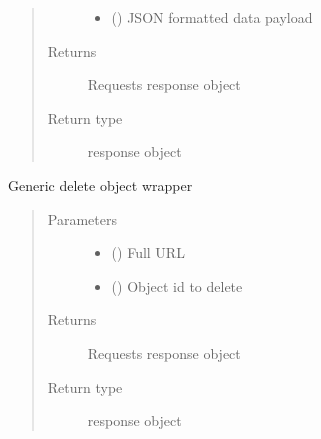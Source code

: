 \documentclass[letterpaper,10pt,english]{sphinxmanual}
\begin{document}
\begin{fulllineitems}
\begin{fulllineitems}
\begin{quote}
\begin{description}
\begin{itemize}
\item {} 
\sphinxAtStartPar
{} () \textendash{} JSON formatted data payload

\end{itemize}

\item[{Returns}] \leavevmode
\sphinxAtStartPar
Requests response object

\item[{Return type}] \leavevmode
\sphinxAtStartPar
response object

\end{description}\end{quote}

\end{fulllineitems}


\begin{fulllineitems}
\label{\detokenize{code:bloxone.bloxone.b1.delete}}
\sphinxAtStartPar
Generic delete object wrapper
\begin{quote}\begin{description}
\item[{Parameters}] \leavevmode\begin{itemize}
\item {} 
\sphinxAtStartPar
{} () \textendash{} Full URL

\item {} 
\sphinxAtStartPar
{} () \textendash{} Object id to delete

\end{itemize}

\item[{Returns}] \leavevmode
\sphinxAtStartPar
Requests response object

\item[{Return type}] \leavevmode
\sphinxAtStartPar
response object

\end{description}\end{quote}


\end{fulllineitems}
\end{fulllineitems}
\end{document}
